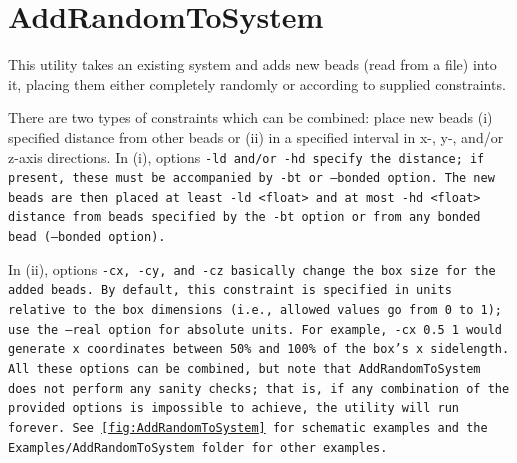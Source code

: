 \section{AddRandomToSystem} \label{sec:AddRandomToSystem}

This utility takes an existing system and adds new beads (read from a \field
file) into it, placing them either completely randomly or according to supplied
constraints.

There are two types of constraints which can be combined: place new beads (i)
specified distance from other beads or (ii) in a specified interval in x-, y-,
and/or z-axis directions. In (i), options \tt{-ld} and/or \tt{-hd} specify the
distance; if present, these must be accompanied by \tt{-bt} or \tt{--bonded}
option. The new beads are then placed at least \tt{-ld <float>} and at most
\tt{-hd <float>} distance from beads specified by the \tt{-bt} option or from
any bonded bead (\tt{--bonded} option).

In (ii), options \tt{-cx}, \tt{-cy}, and \tt{-cz} basically change the box size
for the added beads. By default, this constraint is specified in units relative
to the box dimensions (i.e., allowed values go from 0 to 1); use the \tt{--real}
option for absolute units. For example, \tt{-cx 0.5 1} would generate x
coordinates between 50\% and 100\% of the box's x sidelength. All these options
can be combined, but note that \tt{AddRandomToSystem} does not perform any
sanity checks; that is, if any combination of the provided options is impossible
to achieve, the utility will run forever. See \cref{fig:AddRandomToSystem} for
schematic examples and the \tt{Examples/AddRandomToSystem} folder for other
examples.

